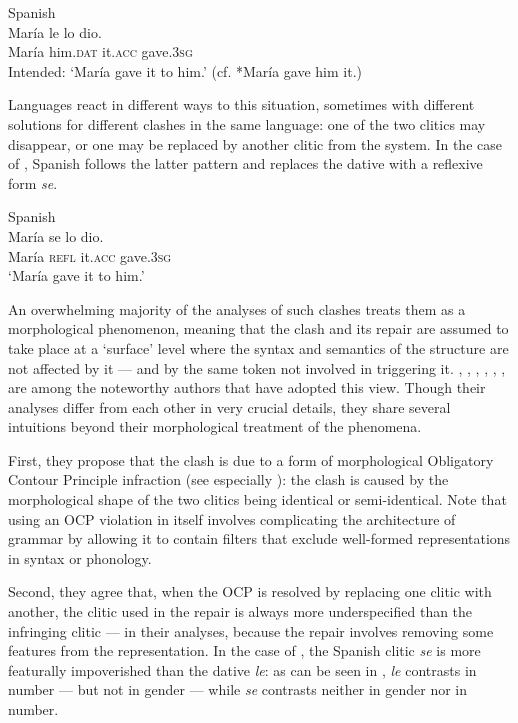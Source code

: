 \documentclass[output=paper,modfonts,nonflat,newtxmath,colorlinks,citecolor=brown]{langsci/langscibook}
\begin{document}
\ea %
    \label{ex:cabre:1}
    Spanish\\
    \gll * María le lo dio.  \\
        { } {María} {him.\textsc{dat}}  it.\textsc{acc}  gave.\textsc{3sg}\\
         \glt { } Intended: ‘María gave it to him.’ (cf. *{María} {gave} {him} {it}.)
    \z


Languages react in different ways to this situation, sometimes with different solutions for different clashes in the same language: one of the two clitics may disappear, or one may be replaced by another clitic from the system. In the case of , Spanish follows the latter pattern and replaces the dative with a reflexive form \textit{se}.

\ea%
    \label{ex:cabre:2}
     Spanish \\
    \gll María  se  lo    dio.\\
        {María}  \textsc{refl}  it.\textsc{acc}  gave.3\textsc{sg}\\
    \glt ‘María gave it to him.’
    \z



 An overwhelming majority of the analyses of such clashes treats them as a morphological phenomenon, meaning that the clash and its repair are assumed to take place at a ‘surface’ level where the syntax and semantics of the structure are not affected by it — and by the same token not involved in triggering it. \citet{Perlmutter1971}, \citet{Bonet1991}, \citet{Bonet1993}, \citet{Bonet1995}, \citet{Grimshaw1997}, \citet{Pescarini2007}, \citet{Nevins2012} are among the noteworthy authors that have adopted this view. Though their analyses differ from each other in very crucial details, they share several intuitions beyond their morphological treatment of the phenomena.

First, they propose that the clash is due to a form of morphological Obligatory Contour Principle infraction (see especially \citealt{Nevins2012}): the clash is caused by the morphological shape of the two clitics being identical or semi-identical. Note that using an OCP violation in itself involves complicating the architecture of grammar by allowing it to contain filters that exclude well-formed representations in syntax or phonology.

Second, they agree that, when the OCP is resolved by replacing one clitic with another, the clitic used in the repair is always more underspecified than the infringing clitic — in their analyses, because the repair involves removing some features from the representation. In the case of , the Spanish clitic \textit{se} is more featurally impoverished than the dative \textit{le}: as can be seen in , \textit{le} contrasts in number — but not in gender — while \textit{se} contrasts neither in gender nor in number.
\end{document}
